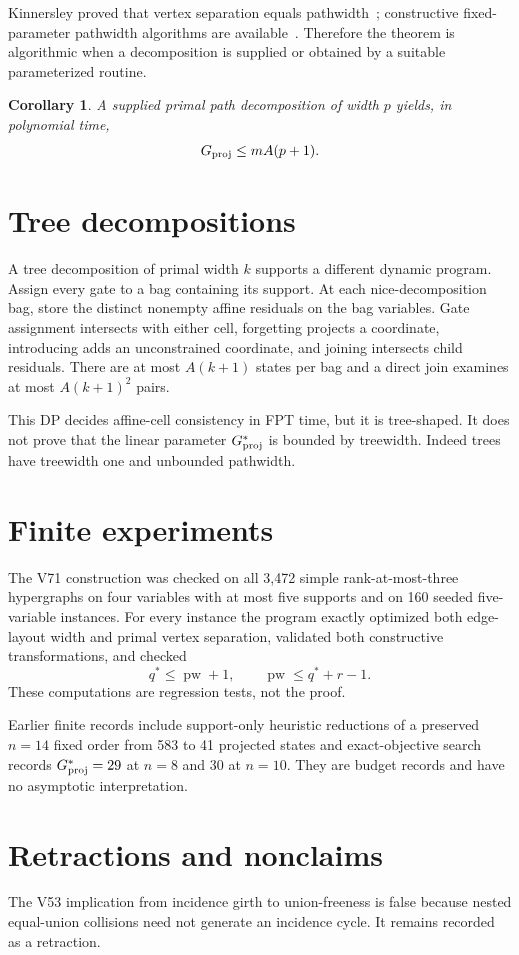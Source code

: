 \documentclass[11pt]{article}
\newtheorem{corollary}[theorem]{Corollary}
\newcommand{\pw}{\operatorname{pw}}
\begin{document}
Kinnersley proved that vertex separation equals pathwidth~\cite{kinnersley-pathwidth}; constructive fixed-parameter pathwidth algorithms are available~\cite{bodlaender-kloks}.  Therefore the theorem is algorithmic when a decomposition is supplied or obtained by a suitable parameterized routine.

\begin{corollary}
A supplied primal path decomposition of width $p$ yields, in polynomial time,
\[
G_{\rm proj}\le mA(p+1).
\]
\end{corollary}

\section{Tree decompositions}
A tree decomposition of primal width $k$ supports a different dynamic program.  Assign every gate to a bag containing its support.  At each nice-decomposition bag, store the distinct nonempty affine residuals on the bag variables.  Gate assignment intersects with either cell, forgetting projects a coordinate, introducing adds an unconstrained coordinate, and joining intersects child residuals.  There are at most $A(k+1)$ states per bag and a direct join examines at most $A(k+1)^2$ pairs.

This DP decides affine-cell consistency in FPT time, but it is tree-shaped.  It does not prove that the linear parameter $G^*_{\rm proj}$ is bounded by treewidth.  Indeed trees have treewidth one and unbounded pathwidth.

\section{Finite experiments}
The V71 construction was checked on all 3,472 simple rank-at-most-three hypergraphs on four variables with at most five supports and on 160 seeded five-variable instances.  For every instance the program exactly optimized both edge-layout width and primal vertex separation, validated both constructive transformations, and checked
\[
q^*\le \pw+1,
\qquad
\pw\le q^*+r-1.
\]
These computations are regression tests, not the proof.

Earlier finite records include support-only heuristic reductions of a preserved $n=14$ fixed order from 583 to 41 projected states and exact-objective search records $G^*_{\rm proj}=29$ at $n=8$ and 30 at $n=10$.  They are budget records and have no asymptotic interpretation.

\section{Retractions and nonclaims}
The V53 implication from incidence girth to union-freeness is false because nested equal-union collisions need not generate an incidence cycle.  It remains recorded as a retraction.
\end{document}
